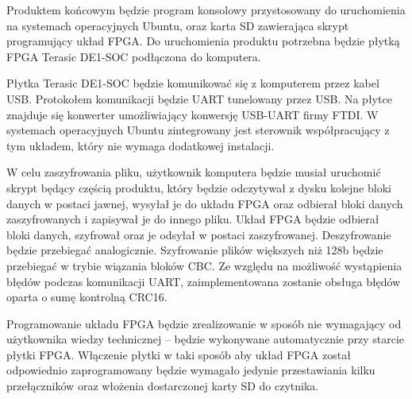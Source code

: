 Produktem końcowym będzie program konsolowy przystosowany do uruchomienia na systemach operacyjnych Ubuntu, oraz karta SD zawierająca skrypt programujący układ FPGA. Do uruchomienia produktu potrzebna będzie płytką FPGA Terasic DE1-SOC podłączona do komputera.

Płytka Terasic DE1-SOC będzie komunikować się z komputerem przez kabel USB. Protokołem komunikacji będzie UART tunelowany przez USB. Na płytce znajduje się konwerter umożliwiający konwersję USB-UART firmy FTDI. W systemach operacyjnych Ubuntu zintegrowany jest sterownik współpracujący z tym układem, który nie wymaga dodatkowej instalacji.

W celu zaszyfrowania pliku, użytkownik komputera będzie musiał uruchomić skrypt będący częścią produktu, który będzie odczytywał z dysku kolejne bloki danych w postaci jawnej, wysyłał je do układu FPGA oraz odbierał bloki danych zaszyfrowanych i zapisywał je do innego pliku. Układ FPGA będzie odbierał bloki danych, szyfrował oraz je odsyłał w postaci zaszyfrowanej. Deszyfrowanie będzie przebiegać analogicznie. Szyfrowanie plików większych niż 128b będzie przebiegać w trybie wiązania bloków CBC. Ze względu na możliwość wystąpienia błędów podczas komunikacji UART, zaimplementowana zostanie obsługa błędów oparta o sumę kontrolną CRC16.

Programowanie układu FPGA będzie zrealizowanie w sposób nie wymagający od użytkownika wiedzy technicznej -- będzie wykonywane automatycznie przy starcie płytki FPGA. Włączenie płytki w taki sposób aby układ FPGA został odpowiednio zaprogramowany będzie wymagało jedynie przestawiania kilku przełączników oraz włożenia dostarczonej karty SD do czytnika. 

\newpage